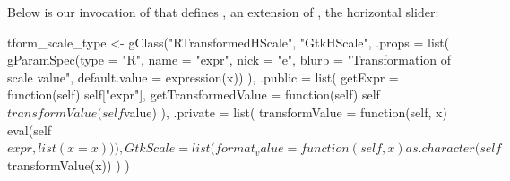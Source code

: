\documentclass[article,shortnames]{jss}
\begin{document}
Below is our invocation of  that
defines , an extension of ,
the horizontal slider:
% 
%
\begin{Code}
tform_scale_type <- gClass("RTransformedHScale", "GtkHScale",
  .props = list(
    gParamSpec(type = "R", name = "expr", nick = "e", 
               blurb = "Transformation of scale value",                 
               default.value = expression(x))
  ),
  .public = list(
    getExpr = function(self) self["expr"],
    getTransformedValue = 
            function(self)
               self$transformValue(self$value)
  ),
  .private = list(
    transformValue = function(self, x) eval(self$expr, list(x = x))
  ),
  GtkScale = list(
    format_value = function(self, x)
      as.character(self$transformValue(x))
  )
)
\end{Code}
\end{document}
